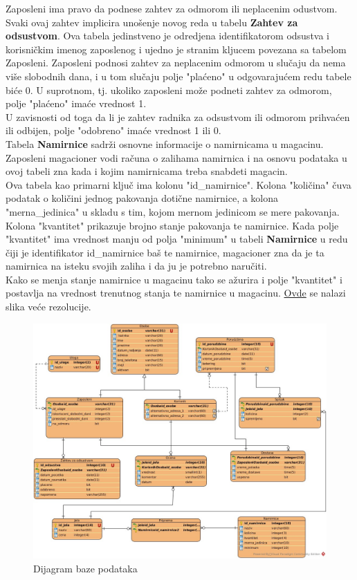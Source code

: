 Zaposleni ima pravo da podnese zahtev za odmorom ili neplacenim odustvom. Svaki ovaj zahtev implicira unošenje novog reda u tabelu \textbf{Zahtev za odsustvom}. Ova tabela jedinstveno je odredjena identifikatorom odsustva i korisničkim imenog zaposlenog i ujedno je stranim kljucem povezana sa tabelom Zaposleni. Zaposleni podnosi zahtev za neplacenim odmorom u slučaju da nema više slobodnih dana, i u tom slučaju polje "plaćeno" u odgovarajućem redu tabele biće 0. U suprotnom, tj. ukoliko zaposleni može podneti zahtev za odmorom, polje  "plaćeno" imaće vrednost 1. \\
\indent U zavisnosti od toga da li je zahtev radnika za odsustvom ili odmorom prihvaćen ili odbijen, polje "odobreno" imaće vrednost 1 ili 0. \\

Tabela \textbf{Namirnice} sadrži osnovne informacije o namirnicama u magacinu. Zaposleni magacioner vodi računa o zalihama namirnica i na osnovu podataka u ovoj tabeli zna kada i kojim namirnicama treba snabdeti magacin. \\ 
\indent Ova tabela kao primarni ključ ima kolonu "id\_namirnice". Kolona "količina" čuva podatak o količini  jednog pakovanja dotične namirnice, a kolona "merna\_jedinica"
u skladu s tim, kojom mernom jedinicom se mere pakovanja. Kolona "kvantitet" prikazuje brojno stanje pakovanja te namirnice.
Kada polje "kvantitet" ima vrednost manju od polja "minimum" u tabeli \textbf{Namirnice} u redu čiji je identifikator id\_namirnice baš te namirnice, magacioner zna da je ta namirnica na isteku svojih zaliha i da ju je potrebno naručiti. \\
\indent Kako se menja stanje namirnice u magacinu tako se ažurira i polje "kvantitet" i postavlja na vrednost trenutnog stanja te namirnice u maga\-cinu.
\href{https://raw.githubusercontent.com/JelenaCosic1994/Porucivanje_hrane/master/slike/Baza.jpg}{Ovde} se nalazi slika veće rezolucije.

\begin{figure}[!h]
    \leavevmode
    \begin{center}
    \includegraphics[width=1.1\textwidth]{slike/Baza.jpg}
    \end{center}
    \caption{Dijagram baze podataka}
    \label{fig:slika11}
\end{figure}
\leavevmode
